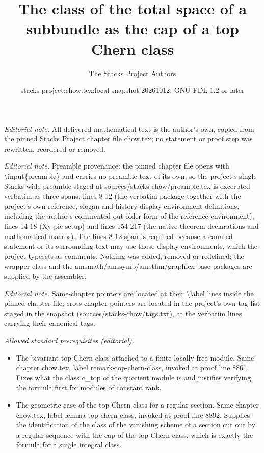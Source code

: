 \documentclass[10pt,a4paper]{amsart}
\title{The class of the total space of a subbundle as the cap of a top Chern class}
\author{The Stacks Project Authors}
\date{stacks-project:chow.tex:local-snapshot-20261012; GNU FDL 1.2 or later}
\theoremstyle{plain}
\theoremstyle{definition}
\theoremstyle{remark}
\numberwithin{equation}{subsection}
\begin{document}
\maketitle
\noindent\textit{Editorial note.} All delivered mathematical text is the author's own, copied from the pinned Stacks Project chapter file chow.tex; no statement or proof step was rewritten, reordered or removed.\par\medskip
\noindent\textit{Editorial note.} Preamble provenance: the pinned chapter file opens with \textbackslash{}input\{preamble\} and carries no preamble text of its own, so the project's single Stacks-wide preamble staged at sources/stacks-chow/preamble.tex is excerpted verbatim as three spans, lines 8-12 (the verbatim package together with the project's own reference, slogan and history display-environment definitions, including the author's commented-out older form of the reference environment), lines 14-18 (Xy-pic setup) and lines 154-217 (the native theorem declarations and mathematical macros). The lines 8-12 span is required because a counted statement or its surrounding text may use those display environments, which the project typesets as comments. Nothing was added, removed or redefined; the wrapper class and the amsmath/amssymb/amsthm/graphicx base packages are supplied by the assembler.\par\medskip
\noindent\textit{Editorial note.} Same-chapter pointers are located at their \textbackslash{}label lines inside the pinned chapter file; cross-chapter pointers are located in the project's own tag list staged in the snapshot (sources/stacks-chow/tags.txt), at the verbatim lines carrying their canonical tags.\par\medskip
\noindent\textit{Allowed standard prerequisites (editorial).}\begin{itemize}
\item The bivariant top Chern class attached to a finite locally free module. Same chapter chow.tex, label remark-top-chern-class, invoked at proof line 8861. Fixes what the class c\_top of the quotient module is and justifies verifying the formula first for modules of constant rank.
\item The geometric case of the top Chern class for a regular section. Same chapter chow.tex, label lemma-top-chern-class, invoked at proof line 8892. Supplies the identification of the class of the vanishing scheme of a section cut out by a regular sequence with the cap of the top Chern class, which is exactly the formula for a single integral class.
\end{itemize}\medskip
\end{document}
